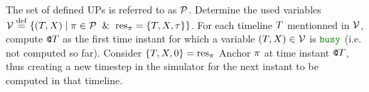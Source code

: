 \begin{algorithm}
  \caption{$\CallCode{anchor\_UPs}{}$ \label{algo:anchor}}
  \begin{algorithmic}[1]
    \REQUIRE The set of defined UPs is referred to as ${\cal P}$.
    \STATE Determine the used variables $\Variables \EqDef \Sets{\Pair\DftTL\DftVar}{\Pat\in\Patterns\And\Res\Pat=\DftRDI}$.
    \STATE For each timeline $T$ mentionned in ${\cal V}$, compute $\mbox{\tt @}{T}$ as the first time instant for which a variable ${\left({T},{X}\right)} \in {\cal V}$ is $\Busy$ (i.e. not computed so far).
    \FORALL{$\Pat \in \Patterns$}
    \STATE Consider ${\left\{T,X,0\right\}} = \mathrm{res}_{\pi}$
    \IF{$\Status{\DI\DftTL\DftVar{\MinT\DftTL} = \Busy}$}
    \STATE Anchor $\pi$ at time instant $\mbox{\tt @}{T}$, thus creating a new timestep in the simulator for the next instant to be computed in that timeline.
    \ELSE
    \STATE {}
    \ENDIF
    \ENDFOR
  \end{algorithmic}
\end{algorithm}

